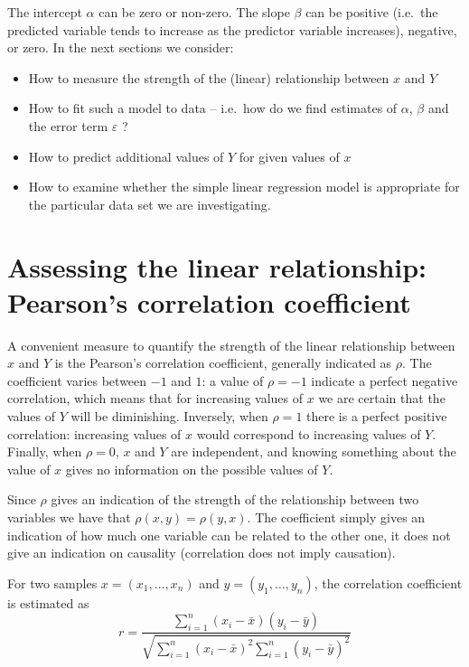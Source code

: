 \documentclass[12pt,a4paper,openany,twoside]{report}
\theoremstyle{definition}
\theoremstyle{remark}
\theoremstyle{plain}
\theoremstyle{definition}
\theoremstyle{definition}
\theoremstyle{definition}
\theoremstyle{remark}
\begin{document}
The intercept \(\alpha\) can be zero or non-zero.
The slope \(\beta\) can be positive (i.e.~the predicted variable tends
to increase as the predictor variable increases), negative, or zero.
In the next sections we consider:

\begin{itemize}
\item
  How to measure the strength of the (linear) relationship between \(x\) and \(Y\)
\item
  How to fit such a model to data -- i.e.~how do we find estimates of \(\alpha\), \(\beta\) and the error term \(\varepsilon\) ?
\item
  How to predict additional values of \(Y\) for given values of \(x\)
\item
  How to examine whether the simple linear regression model is appropriate for the particular data set we are investigating.
\end{itemize}

\hypertarget{slrassess}{%
\section{Assessing the linear relationship: Pearson's correlation coefficient}\label{slrassess}}

A convenient measure to quantify the strength of the linear relationship between \(x\) and \(Y\) is the Pearson's correlation coefficient, generally indicated as \(\rho\).
The coefficient varies between \(-1\) and \(1\): a value of \(\rho = -1\) indicate a perfect negative correlation, which means that for increasing values of \(x\) we are certain that the values of \(Y\) will be diminishing.
Inversely, when \(\rho = 1\) there is a perfect positive correlation: increasing values of \(x\) would correspond to increasing values of \(Y\).
Finally, when \(\rho = 0\), \(x\) and \(Y\) are independent, and knowing something about the value of \(x\) gives no information on the possible values of \(Y\).

Since \(\rho\) gives an indication of the strength of the relationship between two variables we have that \(\rho(x,y) = \rho(y,x)\). The coefficient simply gives an indication of how much one variable can be related to the other one, it does not give an indication on causality (correlation does not imply causation).

For two samples \(x = (x_1, \ldots, x_n)\) and \(y = (y_1, \ldots, y_n)\), the correlation coefficient is estimated as
\[r = \frac{\sum_{i=1}^n (x_i - \bar{x}) (y_i - \bar{y}) }{\sqrt{ \sum_{i=1}^n (x_i - \bar{x})^2 \sum_{i=1}^n (y_i - \bar{y})^2}} \]
\end{document}
